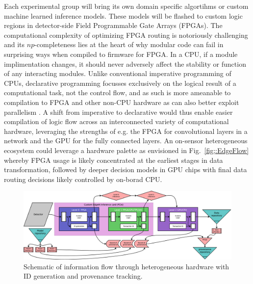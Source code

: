 \documentclass{article}
\begin{document}
Each experimental group will bring its own domain specific algortihms or custom machine learned inference models.
These models will be flashed to custom logic regions in detector-side Field Programmable Gate Arrays (FPGAs).
The computational complexity of optimizing FPGA routing \cite{FPGAcomplexity,FPGAgraph} is notoriously challenging and its $np$-completeness lies at the heart of why modular code can fail in surprising ways when compiled to firmware for FPGA. 
In a CPU, if a module implimentation changes, it should never adversely affect the stability or function of any interacting modules.
Unlike conventional imperative programming of CPUs, declarative programming focusses exclusively on the logical result of a computational task, not the control flow, and as such is more ameanable to compilation to FPGA and other non-CPU hardware as can also better exploit parallelism \cite{Lloyd1994}.
A shift from imperative to declarative would thus enable easier compilation of logic flow across an interconnected variety of computational hardware, leveraging the strengths of e.g. the FPGA for convolutional layers in a network and the GPU for the fully connected layers.
An on-sensor heterogeneous ecosystem could leverage a hardware palette as envisioned in Fig.~\ref{fig;:EdgeFlow} whereby FPGA usage is likely concentrated at the earliest stages in data transformation, followed by deeper decision models in GPU chips with final data routing decisions likely controlled by on-borad CPU.
\begin{figure}
	\centerline{\includegraphics[clip,width=\linewidth]{EdgeFlow.eps}}
	\caption{
		\label{fig::EdgeFlow}
		Schematic of information flow through heterogeneous hardware with ID generation and provenance tracking.
		}
\end{figure}

\end{document}
